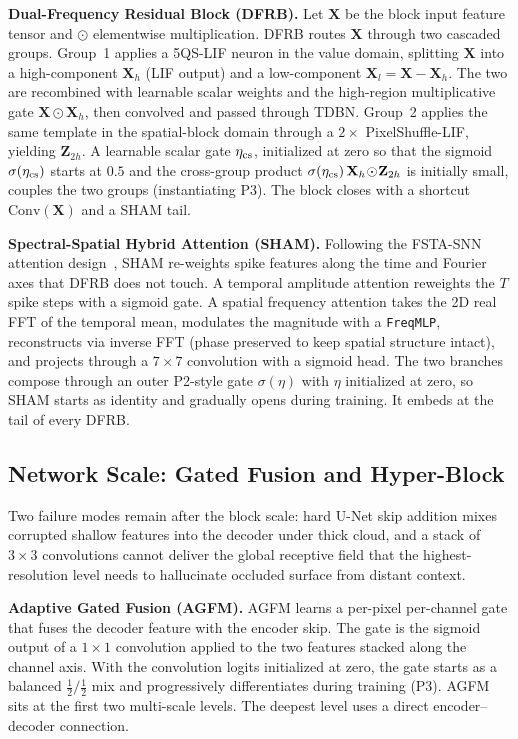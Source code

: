 \documentclass[conference]{IEEEtran}
\newcommand{\DFRB}{\textsc{DFRB}}
\newcommand{\SHAM}{\textsc{SHAM}}
\newcommand{\AGFM}{\textsc{AGFM}}
\begin{document}
\textbf{Dual-Frequency Residual Block (\DFRB{}).} Let
$\mathbf{X}$ be the block input feature tensor and $\odot$
elementwise multiplication. \DFRB{} routes $\mathbf{X}$ through
two cascaded groups. Group~1 applies a 5QS-LIF neuron in the
value domain, splitting $\mathbf{X}$ into a high-component
$\mathbf{X}_h$ (LIF output) and a low-component
$\mathbf{X}_l\!=\!\mathbf{X}\!-\!\mathbf{X}_h$. The two are
recombined with learnable scalar weights and the high-region
multiplicative gate $\mathbf{X}\!\odot\!\mathbf{X}_h$, then
convolved and passed through TDBN. Group~2 applies the same
template in the spatial-block domain through a $2\!\times$
PixelShuffle-LIF, yielding $\mathbf{Z}_{2h}$. A learnable scalar
gate $\eta_{\rm cs}$, initialized at zero so that the sigmoid
$\sigma(\eta_{\rm cs})$ starts at $0.5$ and the cross-group product
$\sigma(\eta_{\rm cs})\,\mathbf{X}_h\!\odot\!\mathbf{Z}_{2h}$ is
initially small, couples the two groups (instantiating P3). The block closes
with a shortcut $\mathrm{Conv}(\mathbf{X})$ and a \SHAM{} tail.

\textbf{Spectral-Spatial Hybrid Attention (\SHAM{}).} Following the
FSTA-SNN attention design~\cite{ref:fstasnn2025}, \SHAM{} re-weights
spike features along the time and Fourier axes that \DFRB{} does
not touch. A temporal amplitude attention reweights the $T$ spike
steps with a sigmoid gate. A spatial frequency attention takes the
2D real FFT of the temporal mean, modulates the magnitude with a
\texttt{FreqMLP}, reconstructs via inverse FFT (phase preserved
to keep spatial structure intact), and projects through a
$7\!\times\!7$ convolution with a sigmoid head. The two branches
compose through an outer P2-style gate $\sigma(\eta)$ with $\eta$
initialized at zero, so \SHAM{} starts as identity and gradually
opens during training. It embeds at the tail of every \DFRB{}.

\subsection{Network Scale: Gated Fusion and Hyper-Block}
\label{sec:framework-network}

Two failure modes remain after the block scale: hard U-Net skip
addition mixes corrupted shallow features into the decoder under
thick cloud, and a stack of $3\!\times\!3$ convolutions cannot
deliver the global receptive field that the highest-resolution
level needs to hallucinate occluded surface from distant context.

\textbf{Adaptive Gated Fusion (\AGFM{}).} \AGFM{} learns a
per-pixel per-channel gate that fuses the decoder feature with
the encoder skip. The gate is the sigmoid output of a
$1\!\times\!1$ convolution applied to the two features stacked
along the channel axis. With the convolution logits initialized
at zero, the gate starts as a balanced $\tfrac{1}{2}/\tfrac{1}{2}$
mix and progressively differentiates during training (P3).
\AGFM{} sits at the first two multi-scale levels. The deepest
level uses a direct encoder--decoder connection.
\end{document}
